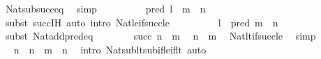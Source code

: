 \begin{isabellebody}
\ Nat{\isacharunderscore}{\kern0pt}sub{\isacharunderscore}{\kern0pt}succ{\isacharunderscore}{\kern0pt}eq\ \isamarkupfalse%
\ simp\isanewline
\ \ \ \ \isamarkupfalse%
\ \isamarkupfalse%
\ {\isachardoublequoteopen}{\isachardot}{\kern0pt}{\isachardot}{\kern0pt}{\isachardot}{\kern0pt}\ {\isacharequal}{\kern0pt}\ pred\ {\isacharparenleft}{\kern0pt}l\ {\isacharplus}{\kern0pt}\ {\isacharparenleft}{\kern0pt}m\ {\isacharminus}{\kern0pt}\ n{\isacharparenright}{\kern0pt}{\isacharparenright}{\kern0pt}{\isachardoublequoteclose}\isanewline
\ \ \ \ \ \ \isamarkupfalse%
\ {\isacharparenleft}{\kern0pt}subst\ succ{\isachardot}{\kern0pt}IH{\isacharparenright}{\kern0pt}\ {\isacharparenleft}{\kern0pt}auto\ intro{\isacharcolon}{\kern0pt}\ Nat{\isacharunderscore}{\kern0pt}le{\isacharunderscore}{\kern0pt}if{\isacharunderscore}{\kern0pt}succ{\isacharunderscore}{\kern0pt}le{\isacharparenright}{\kern0pt}\isanewline
\ \ \ \ \isamarkupfalse%
\ \isamarkupfalse%
\ {\isachardoublequoteopen}{\isachardot}{\kern0pt}{\isachardot}{\kern0pt}{\isachardot}{\kern0pt}\ {\isacharequal}{\kern0pt}\ l\ {\isacharplus}{\kern0pt}\ pred\ {\isacharparenleft}{\kern0pt}m\ {\isacharminus}{\kern0pt}\ n{\isacharparenright}{\kern0pt}{\isachardoublequoteclose}\isanewline
\ \ \ \ \isamarkupfalse%
\ {\isacharparenleft}{\kern0pt}subst\ Nat{\isacharunderscore}{\kern0pt}add{\isacharunderscore}{\kern0pt}pred{\isacharunderscore}{\kern0pt}eq{\isacharparenright}{\kern0pt}\isanewline
\ \ \ \ \ \ \isamarkupfalse%
\ {\isacartoucheopen}succ\ n\ {\isasymle}\ m{\isacartoucheclose}\ \isamarkupfalse%
\ {\isachardoublequoteopen}n\ {\isacharless}{\kern0pt}\ m{\isachardoublequoteclose}\ \isamarkupfalse%
\ Nat{\isacharunderscore}{\kern0pt}lt{\isacharunderscore}{\kern0pt}if{\isacharunderscore}{\kern0pt}succ{\isacharunderscore}{\kern0pt}le\ \isamarkupfalse%
\ simp\isanewline
\ \ \ \ \ \ \isamarkupfalse%
\ \isamarkupfalse%
\ {\isachardoublequoteopen}n\ {\isacharminus}{\kern0pt}\ n\ {\isacharless}{\kern0pt}\ m\ {\isacharminus}{\kern0pt}\ n{\isachardoublequoteclose}\ \isamarkupfalse%
\ {\isacharparenleft}{\kern0pt}intro\ Nat{\isacharunderscore}{\kern0pt}sub{\isacharunderscore}{\kern0pt}lt{\isacharunderscore}{\kern0pt}sub{\isacharunderscore}{\kern0pt}if{\isacharunderscore}{\kern0pt}le{\isacharunderscore}{\kern0pt}if{\isacharunderscore}{\kern0pt}lt{\isacharparenright}{\kern0pt}\ auto\isanewline
\ \ \ \ \ \ \isamarkupfalse%

\end{isabellebody}
